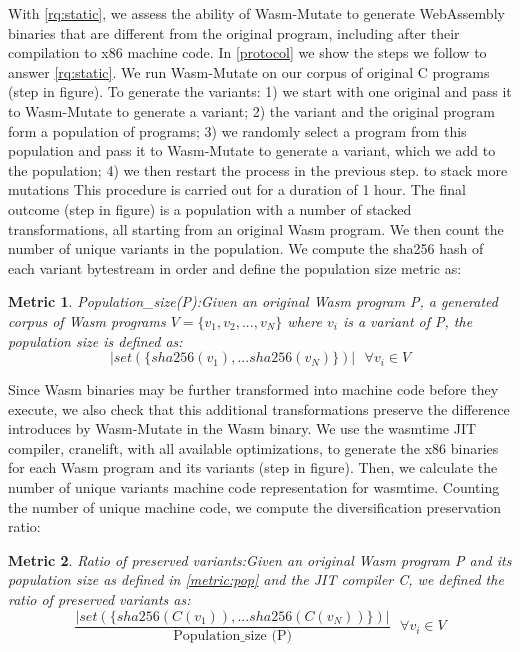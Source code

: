 \documentclass[sigplan,screen]{acmart}
\newcommand{\tool}{{\sc Wasm-Mutate}\xspace}
\newcommand{\wasm}{Wasm\xspace}
\newcommand{\Wasm}{WebAssembly\xspace}
\newtheorem{metric}{Metric}
\newcommand*\step[1]{
\noindent\tikz[baseline=(char.base)]{
        \node[shape=circle,text=black,draw=black, fill=white,inner sep=1.2pt] (char) {#1};}}
\begin{document}
With \ref{rq:static},
we assess the ability of \tool to generate \Wasm binaries that are different from the original program, including after their compilation to x86 machine code.
In \autoref{protocol} we show the steps we follow to answer \ref{rq:static}.
We run \tool on our corpus of \nProgramsRosetta{} original C programs (step \step{1} in figure). 
To generate the variants:
1) we start with one original and pass it to \tool to generate a variant;  
2) the variant and the original program form a population of programs; 
3) we randomly select a program from this population and pass it to \tool to generate a variant, which we add to the population; 
4) we then restart the process in the previous step. to stack more mutations 
This procedure is carried out for a duration of 1 hour.
The final outcome (step \step{2} in figure) is a population with a number of stacked transformations, all starting from an original \wasm program.
We then count the number of unique variants in the population.
We compute the sha256 hash of each variant bytestream in order and define the population size metric as: 


\begin{metric}{Population\_size(P):}\label{metric:pop}
Given an original \wasm program P, a generated corpus of \wasm programs $V=\{v_1, v_2, ..., v_N\}$ where $v_i$ is a variant of P, the population size is defined as:
$$
    | set(\{ sha256(v_1), ... sha256(v_N) \})|\text{ }\forall v_i \in V 
$$
\end{metric}


Since \wasm binaries may be further transformed into machine code before they execute, we also check that this additional transformations preserve the difference introduces by \tool in the \wasm binary. 
We use the wasmtime JIT compiler, cranelift, with all available optimizations, to generate the x86 binaries for each \wasm program and its variants  (step \step{3} in figure). 
Then, we calculate the number of unique variants machine code representation for wasmtime.
Counting the number of unique machine code, we compute the diversification preservation ratio: \\

\begin{metric}{Ratio of preserved variants:}\label{metric:preservation}
    Given an original \wasm program P and its population size as defined in \autoref{metric:pop} and the JIT compiler C, we defined the ratio of preserved variants as:
    $$
        \frac{ | set(\{ sha256(C(v_1)), ... sha256(C(v_N)) \})|}{ \text{Population\_size (P)}} \text{ }\forall v_i \in V 
    $$

    
\end{metric}
\end{document}
